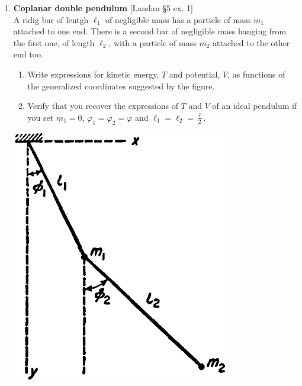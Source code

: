 \documentclass[11pt, a4paper, twoside]{article}
\begin{document}
\begin{enumerate}
\item
	\begin{minipage}[t][4cm]{0.7\textwidth}
		\textbf{Coplanar double pendulum} [Landau \S5 ex. 1]\\
		A ridig bar of lentgh $\ell_1$ of negligible mass has a particle of mass $m_1$ attached to one end. There is a second bar of negligible mass hanging from the first one, of length $\ell_2$, with a particle of mass $m_2$ attached to the other end too.
		\begin{enumerate}
			\item Write expressions for kinetic energy, $T$ and potential, $V$, as functions of the generalized coordinates suggested by the figure.
			\item Verify that you recover the expressions of $T$ and $V$ of an ideal pendulum if you set $m_1=0$, $\varphi_1 = \varphi_2 = \varphi$ and  $\ell_1 = \ell_2 = \frac{\ell}{2}$.
		\end{enumerate}
	\end{minipage}
	\begin{minipage}[c][0.5cm][t]{0.3\textwidth}
		\includegraphics[width=0.75\textwidth]{figures/landauS52_fig1.png}
	\end{minipage}




\end{enumerate}
\end{document}
